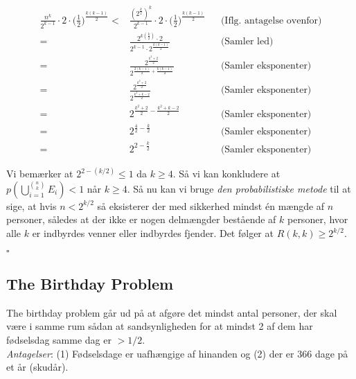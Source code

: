 \documentclass[12pt]{article}
\begin{document}
\begin{align*}
    \frac{n^k}{2^{k-1}} \cdot 2 \cdot \bigg( \frac{1}{2}\bigg)^{\frac{k(k-1)}{2}} <& \frac{(2^{\frac{k}{2}})^k}{2^{k-1}} \cdot 2 \cdot \bigg( \frac{1}{2} \bigg)^{\frac{k(k-1)}{2}} && \text{(Iflg. antagelse ovenfor)} \\
    =& \frac{2^{k(\frac{k}{2})} \cdot 2}{2^{k-1} \cdot 2^{\frac{k(k-1)}{2}}} && \text{(Samler led)} \\
    =& \frac{2^{\frac{k^2+2}{2}}}{2^{\frac{2(k-1)}{2} + \frac{k(k-1)}{2}}} && \text{(Samler eksponenter)} \\
    =& \frac{2^{\frac{k^2+2}{2}}}{2^{\frac{k^2+k-2}{2}}} && \text{(Samler eksponenter)} \\
    =& 2^{\frac{k^2+2}{2}-\frac{k^2+k-2}{2}} && \text{(Samler eksponenter)} \\
    =& 2^{\frac{4}{2}-\frac{k}{2}} && \text{(Samler eksponenter)} \\
    =& 2^{2-\frac{k}{2}} && \text{(Samler eksponenter)}
\end{align*}

Vi bemærker at $2^{2-(k/2)} \le 1$ da $k \ge 4$. Så vi kan konkludere at $p(\bigcup_{i=1}^{\binom{n}{k}} E_i) < 1$ når $k\ge 4$. %
Så nu kan vi bruge \textit{den probabilistiske metode} til at sige, at hvis $n<2^{k/2}$ så eksisterer der med sikkerhed mindst én mængde af $n$ personer, således at der ikke er nogen delmængder bestående af $k$ personer, hvor alle $k$ er indbyrdes venner eller indbyrdes fjender. Det følger at $R(k,k) \ge 2^{k/2}$. 

\begin{flushright}
    $\square$
\end{flushright}

\subsection*{The Birthday Problem}

The birthday problem går ud på at afgøre det mindst antal personer, der skal være i samme rum sådan at sandsynligheden for at mindst 2 af dem har fødselsdag samme dag er $>1/2$. \\

\textit{Antagelser}: (1) Fødselsdage er uafhængige af hinanden og (2) der er 366 dage på et år (skudår). \\
\end{document}
